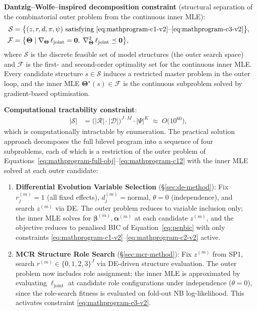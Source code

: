 \documentclass[letterpaper,8pt]{extarticle}  %
\begin{document}
\begin{doublespacing}
\begin{linenumbers}
\noindent\textbf{Dantzig--Wolfe--inspired decomposition constraint} (structural separation of the combinatorial outer problem from the continuous inner MLE):
\begin{align}
  \mathcal{S} &= \bigl\{(z,r,d,\pi,\psi) \text{ satisfying \eqref{eq:mathprogram-c1-v2}--\eqref{eq:mathprogram-c3-v2}}\bigr\}, \label{eq:mathprogram-c11}\\
  \mathcal{F} &= \bigl\{\boldsymbol\Theta \mid \nabla_{\boldsymbol\Theta}\,\ell_{\text{joint}} = \mathbf{0},\; \nabla^2_{\boldsymbol\Theta}\,\ell_{\text{joint}} \preceq \mathbf{0}\bigr\}, \label{eq:mathprogram-c12}
\end{align}
where $\mathcal{S}$ is the discrete feasible set of model structures (the outer search space) and $\mathcal{F}$ is the first- and second-order optimality set for the continuous inner MLE. Every candidate structure $s \in \mathcal{S}$ induces a restricted master problem in the outer loop, and the inner MLE $\boldsymbol\Theta^\star(s) \in \mathcal{F}$ is the continuous subproblem solved by gradient-based optimisation.

\noindent\textbf{Computational tractability constraint}:
\begin{align}
  |\mathcal{S}| &= \bigl(|\mathcal{R}| \cdot |\mathcal{D}|\bigr)^{J \cdot M} \cdot |\Psi|^{K} \;\approx\; O\bigl(10^{60}\bigr), \label{eq:mathprogram-c13}
\end{align}
which is computationally intractable by enumeration. The practical solution approach decomposes the full bilevel program into a sequence of four subproblems, each of which is a restriction of the outer problem of Equations~\eqref{eq:mathprogram-full-obj}--\eqref{eq:mathprogram-c12} with the inner MLE solved at each outer candidate:

\begin{enumerate}[label=\textbf{SP\arabic*.}, leftmargin=*]
  \item \textbf{Differential Evolution Variable Selection} (\S\ref{sec:de-method}): Fix $r_j^{(m)} = 1$ (all fixed effects), $d_j^{(m)} = \text{normal}$, $\theta = 0$ (independence), and search $z^{(m)}$ via DE. The outer problem reduces to variable inclusion only; the inner MLE solves for $\boldsymbol\beta^{(m)}, \boldsymbol\alpha^{(m)}$ at each candidate $z^{(m)}$, and the objective reduces to penalised BIC of Equation~\eqref{eq:penbic} with only constraints \eqref{eq:mathprogram-c1-v2}--\eqref{eq:mathprogram-c2-v2} active.

  \item \textbf{MCR Structure Role Search} (\S\ref{sec:mcr-method}): Fix $z^{(m)}$ from SP1, search $r^{(m)} \in \{0,1,2,3\}^J$ via DE-driven structure evaluation. The outer problem now includes role assignment; the inner MLE is approximated by evaluating $\ell_{\text{joint}}$ at candidate role configurations under independence ($\theta = 0$), since the role-search fitness is evaluated on fold-out NB log-likelihood. This activates constraint \eqref{eq:mathprogram-c3-v2}.


\end{enumerate}
\end{linenumbers}
\end{doublespacing}
\end{document}
